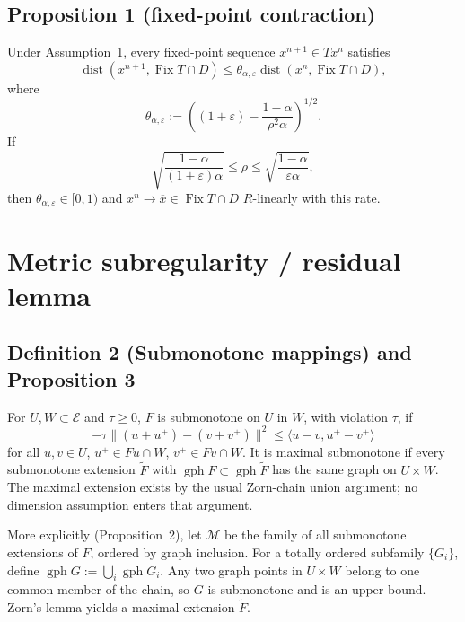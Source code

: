 \documentclass[11pt]{article}
\newcommand{\E}{\mathcal E}
\newcommand{\dist}{\operatorname{dist}}
\newcommand{\gph}{\operatorname{gph}}
\newcommand{\Fix}{\operatorname{Fix}}
\newcommand{\barx}{\overline{x}}
\begin{document}
\subsection*{Proposition 1 (fixed-point contraction)}

Under Assumption~1, every fixed-point sequence \(x^{n+1}\in Tx^n\) satisfies
\begin{equation}
 \dist(x^{n+1},\Fix T\cap D)\le\theta_{\alpha,\varepsilon}
 \dist(x^n,\Fix T\cap D),                                   \tag{6}
\end{equation}
where
\begin{equation}
 \theta_{\alpha,\varepsilon}:=
 \left((1+\varepsilon)-\frac{1-\alpha}{\rho^2\alpha}\right)^{1/2}. \tag{7}
\end{equation}
If
\begin{equation}
 \sqrt{\frac{1-\alpha}{(1+\varepsilon)\alpha}}
 \le \rho\le
 \sqrt{\frac{1-\alpha}{\varepsilon\alpha}},                         \tag{8}
\end{equation}
then \(\theta_{\alpha,\varepsilon}\in[0,1)\) and \(x^n\to\barx\in\Fix T\cap D\) \(R\)-linearly with this rate.

\section{Metric subregularity / residual lemma}

\subsection*{Definition 2 (Submonotone mappings) and Proposition 3}

For \(U,W\subset\E\) and \(\tau\ge0\), \(F\) is submonotone on \(U\) in \(W\), with violation \(\tau\), if
\begin{equation}
 -\tau\|(u+u^+)-(v+v^+)\|^2
 \le\langle u-v,u^+-v^+\rangle                         \tag{10}
\end{equation}
for all \(u,v\in U\), \(u^+\in Fu\cap W\), \(v^+\in Fv\cap W\). It is maximal submonotone if every submonotone extension \(\widetilde F\) with \(\gph F\subset\gph\widetilde F\) has the same graph on \(U\times W\). The maximal extension exists by the usual Zorn-chain union argument; no dimension assumption enters that argument.

More explicitly (Proposition~2), let \(\mathcal M\) be the family of all submonotone extensions of \(F\), ordered by graph inclusion. For a totally ordered subfamily \(\{G_i\}\), define \(\gph G:=\bigcup_i\gph G_i\). Any two graph points in \(U\times W\) belong to one common member of the chain, so \(G\) is submonotone and is an upper bound. Zorn's lemma yields a maximal extension \(\widetilde F\).
\end{document}

